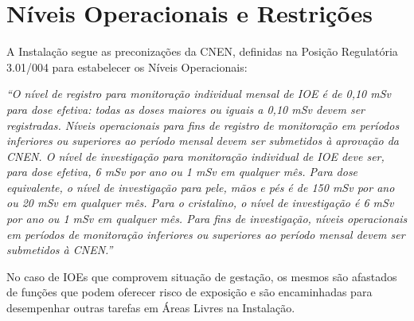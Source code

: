 \chapter{Níveis Operacionais e Restrições}
A Instalação segue as preconizações da CNEN, definidas na Posição Regulatória 3.01/004 para estabelecer os Níveis Operacionais:

\textit{“O nível de registro para monitoração individual mensal de IOE é de 0,10 mSv para dose efetiva: todas as doses maiores ou iguais a 0,10 mSv devem ser registradas. Níveis operacionais para fins de registro de monitoração em períodos inferiores ou superiores ao período mensal devem ser submetidos à aprovação da CNEN. O nível de investigação para monitoração individual de IOE deve ser, para dose efetiva, 6 mSv por ano ou 1 mSv em qualquer mês. Para dose equivalente, o nível de investigação para pele, mãos e pés é de 150 mSv por ano ou 20 mSv em qualquer mês. Para o cristalino, o nível de investigação é 6 mSv por ano ou 1 mSv em qualquer mês. Para fins de investigação, níveis operacionais em períodos de monitoração inferiores ou superiores ao período mensal devem ser submetidos à CNEN.”}

No caso de IOEs que comprovem situação de gestação, os mesmos são afastados de funções que podem oferecer risco de exposição e são encaminhadas para desempenhar outras tarefas em Áreas Livres na Instalação.